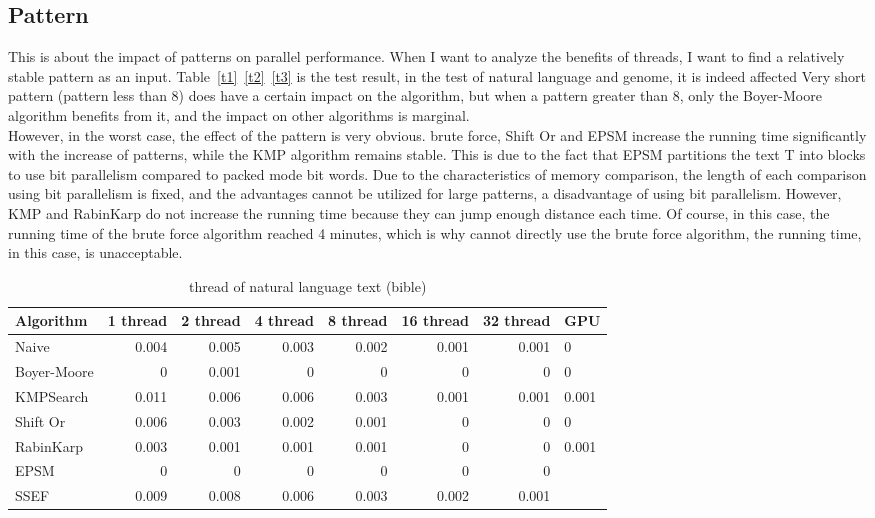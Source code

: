 \documentclass[11pt]{article}       %
\begin{document}
\subsection{Pattern}\label{pf}



This is about the impact of patterns on parallel performance. When I want to analyze the benefits of threads, I want to find a relatively stable pattern as an input. Table~\ref{t1}~\ref{t2}~\ref{t3} is the test result,  in the test of natural language and genome, it is indeed affected Very short pattern (pattern less than 8) does have a certain impact on the algorithm, but when a pattern greater than 8, only the Boyer-Moore algorithm benefits from it, and the impact on other algorithms is marginal. \\
However, in the worst case, the effect of the pattern is very obvious. brute force, Shift Or and EPSM increase the running time significantly with the increase of patterns, while the KMP algorithm remains stable. This is due to the fact that EPSM partitions the text T into blocks to use bit parallelism compared to packed mode bit words. Due to the characteristics of memory comparison, the length of each comparison using bit parallelism is fixed, and the advantages cannot be utilized for large patterns, a disadvantage of using bit parallelism. However, KMP and RabinKarp do not increase the running time because they can jump enough distance each time. Of course, in this case, the running time of the brute force algorithm reached 4 minutes, which is why cannot directly use the brute force algorithm, the running time, in this case, is unacceptable.





\begin{table}[htbp]
  \centering
  \caption{thread of natural language text (bible)}
    \begin{tabular}{lrrrrrr}\label{t4}
Algorithm & 1 thread & 2 thread & 4 thread & 8 thread & 16 thread & 32 thread & GPU \\
 \hline
    Naive & 0.004 & 0.005 & 0.003 & 0.002 & 0.001 & 0.001 & 0 \\
    {Boyer-Moore} & 0     & 0.001 & 0     & 0     & 0     & 0     & 0 \\
    KMPSearch & 0.011 & 0.006 & 0.006 & 0.003 & 0.001 & 0.001 & 0.001 \\
    Shift Or & 0.006 & 0.003 & 0.002 & 0.001 & 0     & 0     & 0 \\
    RabinKarp & 0.003 & 0.001 & 0.001 & 0.001 & 0     & 0     & 0.001 \\
    EPSM  & 0     & 0     & 0     & 0     & 0     & 0     &  \\
    SSEF  & 0.009 & 0.008 & 0.006 & 0.003 & 0.002 & 0.001 &  \\
    \end{tabular}%
  \label{tab:addlabel}%
\end{table}%
\end{document}
